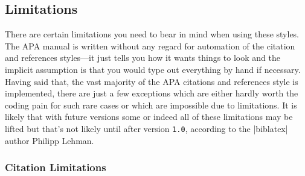 \documentclass{ltxdockit}
\begin{document}
\subsection{Limitations}
\label{use:limit}
There are certain limitations you need to bear in mind when using these
styles. The APA manual is written without any regard for automation of the
citation and references styles---it just tells you how it wants things to
look and the implicit assumption is that you would type out everything by
hand if necessary. Having said that, the vast majority of the APA citations
and references style is implemented, there are just a few exceptions which
are either hardly worth the coding pain for such rare cases or which are
impossible due to  limitations. It is likely that with future
 versions some or indeed all of these limitations may be
lifted but that's not likely until after  version
\texttt{1.0}, according to the |biblatex| author Philipp Lehman.

\subsubsection{Citation Limitations}
\end{document}
